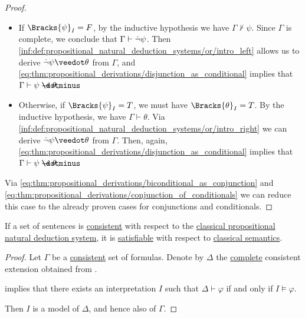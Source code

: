 \begin{proof}
  \begin{itemize}
    \item If \( \Bracks{\psi}_I = F \), by the inductive hypothesis we have \( \Gamma \not\vdash \psi \). Since \( \Gamma \) is complete, we conclude that \( \Gamma \vdash \dot{\neg} \psi \). Then \ref{inf:def:propositional_natural_deduction_systems/or/intro_left} allows us to derive \( \synneg \psi \synvee \theta \) from \( \Gamma \), and \eqref{eq:thm:propositional_derivations/disjunction_as_conditional} implies that \( \Gamma \vdash \psi \synimplies \theta \).

    \item Otherwise, if \( \Bracks{\psi}_I = T \), we must have \( \Bracks{\theta}_I = T \). By the inductive hypothesis, we have \( \Gamma \vdash \theta \). Via \ref{inf:def:propositional_natural_deduction_systems/or/intro_right} we can derive \( \synneg \psi \synvee \theta \) from \( \Gamma \). Then, again, \eqref{eq:thm:propositional_derivations/disjunction_as_conditional} implies that \( \Gamma \vdash \psi \synimplies \theta \).
  \end{itemize}

   Via \eqref{eq:thm:propositional_derivations/biconditional_as_conjunction} and \eqref{eq:thm:propositional_derivations/conjunction_of_conditionals} we can reduce this case to the already proven cases for conjunctions and conditionals.
\end{proof}

\begin{corollary}\label{thm:consistent_implies_satisfiable}
  If a set of sentences is \hyperref[def:consistent_set_of_sentences]{consistent} with respect to the \hyperref[def:abstract_natural_deduction_system]{classical propositional natural deduction system}, it is \hyperref[def:satisfiable_set_of_sentences]{satisfiable} with respect to \hyperref[def:propositional_semantics/classical]{classical semantics}.
\end{corollary}
\begin{proof}
  Let \( \Gamma \) be a \hyperref[def:consistent_set_of_sentences]{consistent} set of formulas. Denote by \( \Delta \) the \hyperref[def:complete_set_of_sentences]{complete} consistent extension obtained from .

   implies that there exists an interpretation \( I \) such that \( \Delta \vdash \varphi \) if and only if \( I \vDash \varphi \).

  Then \( I \) is a model of \( \Delta \), and hence also of \( \Gamma \).
\end{proof}

